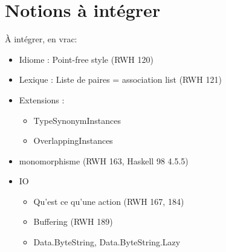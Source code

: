\section{Notions à intégrer}

À intégrer, en vrac:

\begin{itemize}
    \item Idiome : Point-free style (RWH 120)
    \item Lexique : Liste de paires = association list (RWH 121)
    \item Extensions :
    \begin{itemize}
        \item TypeSynonymInstances
        \item OverlappingInstances
    \end{itemize}
    \item monomorphisme (RWH 163, Haskell 98 4.5.5)
    \item IO
    \begin{itemize}
        \item Qu'est ce qu'une action (RWH 167, 184)
        \item Buffering (RWH 189)
        \item Data.ByteString, Data.ByteString.Lazy
    \end{itemize}

\end{itemize}
